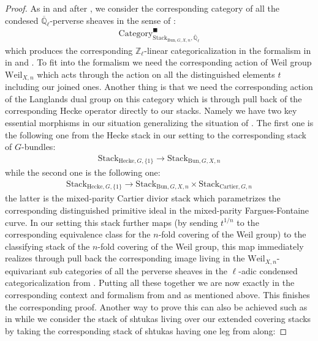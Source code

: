 \documentclass[12pt]{article}
\theoremstyle{definition}
\begin{document}
\begin{proof}
As in \cite[Chapter IX 4.1, Chapter VIII 4.1]{FS} and after \cite{VL}, we consider the corresponding category of all the condesed $\overline{\mathbb{Q}}_\ell$-perverse sheaves in the sense of \cite{FS}:
\begin{align}
\mathrm{Category}^\blacksquare_{\mathrm{Stack}_{\mathrm{Bun},G,X,n},\overline{\mathbb{Q}}_\ell}
\end{align}
which produces the corresponding $\mathbb{Z}_\ell$-linear categoricalization in the formalism in in \cite[Chapter IX 4.1, Chapter VIII 4.1]{FS} and \cite{VL}. To fit into the formalism we need the corresponding action of Weil group $\mathrm{Weil}_{X,n}$ which acts through the action on all the distinguished elements $t$ including our joined ones. Another thing is that we need the corresponding action of the Langlands dual group on this category which is through pull back of the corresponding Hecke operator directly to our stacks. Namely we have two key essential morphisms in our situation generalizing the situation of \cite{FS}. The first one is the following one from the Hecke stack in our setting to the corresponding stack of $G$-bundles:
\begin{align}
\mathrm{Stack}_{\mathrm{Hecke},G,\{1\}}\longrightarrow \mathrm{Stack}_{\mathrm{Bun},G,X,n}
\end{align}
while the second one is the following one:
\begin{align}
\mathrm{Stack}_{\mathrm{Hecke},G,\{1\}}\longrightarrow \mathrm{Stack}_{\mathrm{Bun},G,X,n}\times \mathrm{Stack}_{\mathrm{Cartier},G,n}
\end{align}
the latter is the mixed-parity Cartier divior stack which parametrizes the corresponding distinguished primitive ideal in the mixed-parity Fargues-Fontaine curve. In our setting this stack further maps (by sending $t^{1/n}$ to the corresponding equivalence class for the $n$-fold covering of the Weil group) to the classifying stack of the $n$-fold covering of the Weil group, this map immediately realizes through pull back the corresponding image living in the $\mathrm{Weil}_{X,n}$-equivariant sub categories of all the perverse sheaves in the $\ell$-adic condensed categoricalization from \cite{FS}. Putting all these together we are now exactly in the corresponding context and formalism from \cite{FS} and \cite{VL} as mentioned above. This finishes the corresponding proof. Another way to prove this can also be achieved such as in \cite[Chapter I]{FS} while we consider the stack of shtukas living over our extended covering stacks by taking the corresponding stack of shtukas having one leg from \cite{FS} along:

\end{proof}
\end{document}
